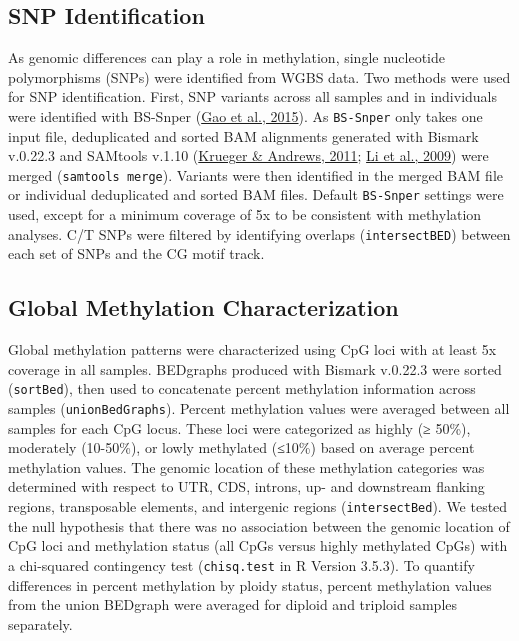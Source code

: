 \documentclass [11pt, proquest] {uwthesis}[2015/03/03]
\begin{document}
\hypertarget{snp-identification-2}{%
\subsection{SNP Identification}\label{snp-identification-2}}

As genomic differences can play a role in methylation, single nucleotide polymorphisms (SNPs) were identified from WGBS data. Two methods were used for SNP identification. First, SNP variants across all samples and in individuals were identified with BS-Snper (\protect\hyperlink{ref-Gao2015}{Gao et al., 2015}). As \texttt{BS-Snper} only takes one input file, deduplicated and sorted BAM alignments generated with Bismark v.0.22.3 and SAMtools v.1.10 (\protect\hyperlink{ref-Krueger2011}{Krueger \& Andrews, 2011}; \protect\hyperlink{ref-Li2009}{Li et al., 2009}) were merged (\texttt{samtools\ merge}). Variants were then identified in the merged BAM file or individual deduplicated and sorted BAM files. Default \texttt{BS-Snper} settings were used, except for a minimum coverage of 5x to be consistent with methylation analyses. C/T SNPs were filtered by identifying overlaps (\texttt{intersectBED}) between each set of SNPs and the CG motif track.

\hypertarget{global-methylation-characterization-1}{%
\subsection{Global Methylation Characterization}\label{global-methylation-characterization-1}}

Global methylation patterns were characterized using CpG loci with at least 5x coverage in all samples. BEDgraphs produced with Bismark v.0.22.3 were sorted (\texttt{sortBed}), then used to concatenate percent methylation information across samples (\texttt{unionBedGraphs}). Percent methylation values were averaged between all samples for each CpG locus. These loci were categorized as highly (≥ 50\%), moderately (10-50\%), or lowly methylated (≤10\%) based on average percent methylation values. The genomic location of these methylation categories was determined with respect to UTR, CDS, introns, up- and downstream flanking regions, transposable elements, and intergenic regions (\texttt{intersectBed}). We tested the null hypothesis that there was no association between the genomic location of CpG loci and methylation status (all CpGs versus highly methylated CpGs) with a chi-squared contingency test (\texttt{chisq.test} in R Version 3.5.3). To quantify differences in percent methylation by ploidy status, percent methylation values from the union BEDgraph were averaged for diploid and triploid samples separately.
\end{document}
